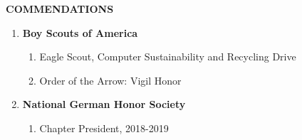 \documentclass[11pt]{article}
\begin{document}
{\Large \textbf{COMMENDATIONS}}
\begin{enumerate}[label={}]
	\item	\textbf{Boy Scouts of America}
			\begin{enumerate}[label={--}]
				\item Eagle Scout, Computer Sustainability and Recycling Drive
				\item Order of the Arrow: Vigil Honor
			\end{enumerate}
	\item	\textbf{National German Honor Society}
			\begin{enumerate}[label={--}]
				\item Chapter President, 2018-2019
			\end{enumerate}
\end{enumerate}
\end{document}
